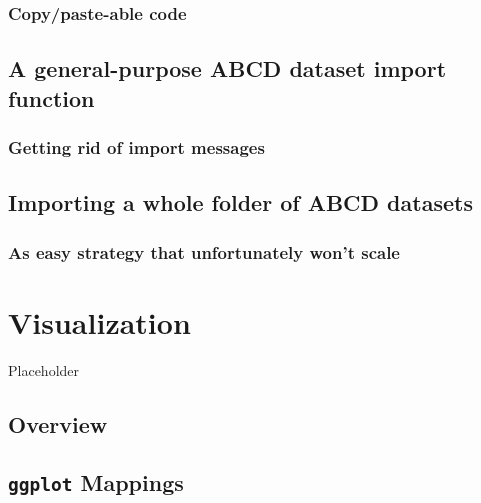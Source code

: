 \documentclass[
]{book}
\begin{document}
\hypertarget{copypaste-able-code}{%
\subsection{Copy/paste-able code}\label{copypaste-able-code}}

\hypertarget{a-general-purpose-abcd-dataset-import-function}{%
\section{A general-purpose ABCD dataset import function}\label{a-general-purpose-abcd-dataset-import-function}}

\hypertarget{getting-rid-of-import-messages}{%
\subsection{Getting rid of import messages}\label{getting-rid-of-import-messages}}

\hypertarget{importing-a-whole-folder-of-abcd-datasets}{%
\section{Importing a whole folder of ABCD datasets}\label{importing-a-whole-folder-of-abcd-datasets}}

\hypertarget{as-easy-strategy-that-unfortunately-wont-scale}{%
\subsection{As easy strategy that unfortunately won't scale}\label{as-easy-strategy-that-unfortunately-wont-scale}}

\hypertarget{visualization}{%
\chapter{Visualization}\label{visualization}}

Placeholder

\hypertarget{overview}{%
\section{Overview}\label{overview}}

\hypertarget{ggplot-mappings}{%
\section{\texorpdfstring{\texttt{ggplot} Mappings}{ggplot Mappings}}\label{ggplot-mappings}}
\end{document}
